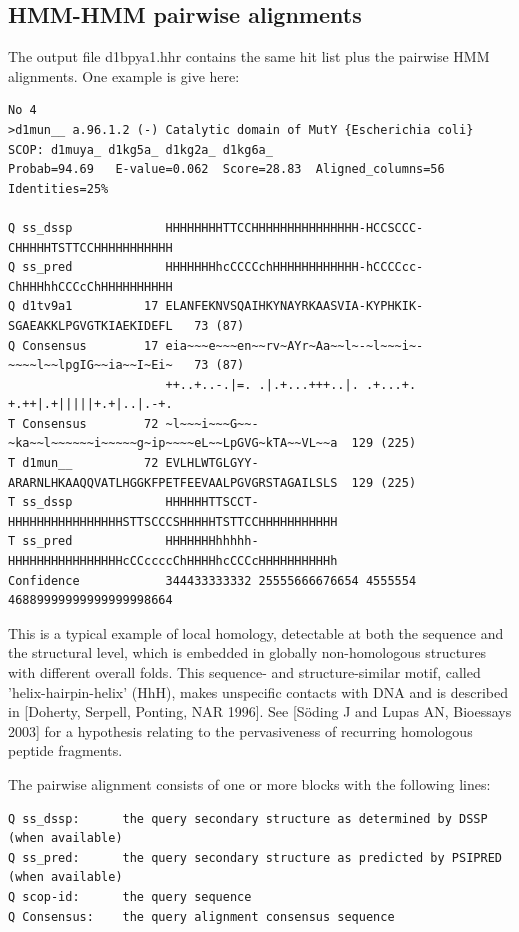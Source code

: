 \documentclass[11pt,a4paper]{article}
\begin{document}
\subsection{HMM-HMM pairwise alignments}

The output file d1bpya1.hhr contains the same hit list plus the pairwise HMM alignments. One example is give here:

\scriptsize\begin{verbatim}
No 4  
>d1mun__ a.96.1.2 (-) Catalytic domain of MutY {Escherichia coli} SCOP: d1muya_ d1kg5a_ d1kg2a_ d1kg6a_ 
Probab=94.69   E-value=0.062  Score=28.83  Aligned_columns=56  Identities=25%

Q ss_dssp             HHHHHHHHTTCCHHHHHHHHHHHHHHH-HCCSCCC-CHHHHHTSTTCCHHHHHHHHHHH
Q ss_pred             HHHHHHHhcCCCCchHHHHHHHHHHHH-hCCCCcc-ChHHHhhCCCcChHHHHHHHHHH
Q d1tv9a1          17 ELANFEKNVSQAIHKYNAYRKAASVIA-KYPHKIK-SGAEAKKLPGVGTKIAEKIDEFL   73 (87)
Q Consensus        17 eia~~~e~~~en~~rv~AYr~Aa~~l~-~l~~~i~-~~~~l~~lpgIG~~ia~~I~Ei~   73 (87)
                      ++..+..-.|=. .|.+...+++..|. .+...+. +.++|.+|||||+.+|..|.-+.
T Consensus        72 ~l~~~i~~~G~~-~ka~~l~~~~~~i~~~~~g~ip~~~~eL~~LpGVG~kTA~~VL~~a  129 (225)
T d1mun__          72 EVLHLWTGLGYY-ARARNLHKAAQQVATLHGGKFPETFEEVAALPGVGRSTAGAILSLS  129 (225)
T ss_dssp             HHHHHHTTSCCT-HHHHHHHHHHHHHHHHSTTSCCCSHHHHHTSTTCCHHHHHHHHHHH
T ss_pred             HHHHHHHhhhhh-HHHHHHHHHHHHHHHHcCCccccChHHHHhcCCCcHHHHHHHHHHh
Confidence            344433333332 25555666676654 4555554 46889999999999999998664
\end{verbatim}\normalsize

This is a typical example of local homology, detectable at both the sequence and the
structural level, which is embedded in globally non-homologous structures with 
different overall folds. This sequence- and structure-similar motif, called 
'helix-hairpin-helix' (HhH), makes unspecific contacts with DNA and is described 
in [Doherty, Serpell, Ponting, NAR 1996]. See [S\"oding J and Lupas AN, Bioessays 
2003] for a hypothesis relating to the pervasiveness of recurring homologous
peptide fragments.

The pairwise alignment consists of one or more blocks with the following lines:

\small\begin{verbatim}
Q ss_dssp:      the query secondary structure as determined by DSSP (when available)
Q ss_pred:      the query secondary structure as predicted by PSIPRED (when available)
Q scop-id:      the query sequence
Q Consensus:    the query alignment consensus sequence
\end{verbatim}\normalsize
\end{document}
